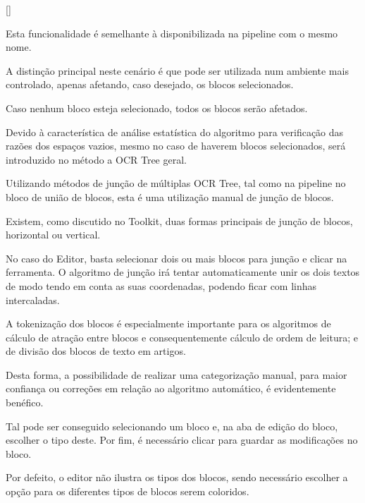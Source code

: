 

[\normalsize]

Esta funcionalidade é semelhante à disponibilizada na pipeline com o mesmo nome.

A distinção principal neste cenário é que pode ser utilizada num ambiente mais controlado, apenas afetando, caso desejado, os blocos selecionados.

Caso nenhum bloco esteja selecionado, todos os blocos serão afetados.

Devido à característica de análise estatística do algoritmo para verificação das razões dos espaços vazios, mesmo no caso de haverem blocos selecionados, será introduzido no método a OCR Tree geral.




Utilizando métodos de junção de múltiplas OCR Tree, tal como na pipeline no bloco de união de blocos, esta é uma utilização manual de junção de blocos.

Existem, como discutido no Toolkit, duas formas principais de junção de blocos, horizontal ou vertical.

No caso do Editor, basta selecionar dois ou mais blocos para junção e clicar na ferramenta. O algoritmo de junção irá tentar automaticamente unir os dois textos de modo tendo em conta as suas coordenadas, podendo ficar com linhas intercaladas.




A tokenização dos blocos é especialmente importante para os algoritmos de cálculo de atração entre blocos e consequentemente cálculo de ordem de leitura; e de divisão dos blocos de texto em artigos.

Desta forma, a possibilidade de realizar uma categorização manual, para maior confiança ou correções em relação ao algoritmo automático, é evidentemente benéfico.

Tal pode ser conseguido selecionando um bloco e, na aba de edição do bloco, escolher o tipo deste. Por fim, é necessário clicar para guardar as modificações no bloco.


Por defeito, o editor não ilustra os tipos dos blocos, sendo necessário escolher a opção para os diferentes tipos de blocos serem coloridos.

